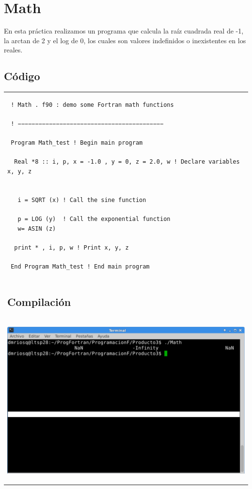 \documentclass[10pt]{article}
\begin{document}
\section{Math}
En esta práctica realizamos un programa que calcula la raíz cuadrada real de -1, la arctan de 2 y el log de 0, los cuales son valores indefinidos o inexistentes en los reales.

\subsection{Código}
\begin{tabular}{l}
\begin{verbatim}  
 ! Math . f90 : demo some Fortran math functions

 ! −−−−−−−−−−−−−−−−−−−−−−−−−−−−−−−−−−−−−−−−−−

 Program Math_test ! Begin main program

  Real *8 :: i, p, x = -1.0 , y = 0, z = 2.0, w ! Declare variables x, y, z

 
   i = SQRT (x) ! Call the sine function

   p = LOG (y)  ! Call the exponential function
   w= ASIN (z)

  print * , i, p, w ! Print x, y, z

 End Program Math_test ! End main program 
\end{verbatim} \\
\subsection{Compilación}\\

\begin{center}
   \includegraphics[scale=0.4]{M}
\end{center}
\end{tabular}
\end{document}
